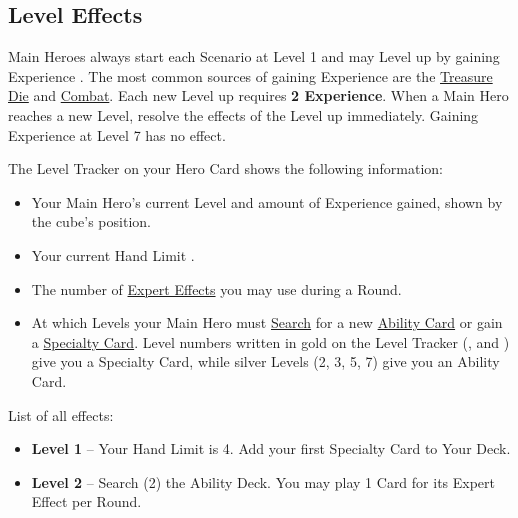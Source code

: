 
\clearpage

\begin{multicols}{2}

\subsection*{\hypertarget{Level}{Level Effects}}
Main Heroes always start each Scenario at Level 1 and may Level up by gaining Experience .
The most common sources of gaining Experience are the \hyperlink{Resources}{Treasure Die}  and \hyperlink{Combatexperience}{Combat}.
Each new Level up requires \textbf{2 Experience}.
When a Main Hero reaches a new Level, resolve the effects of the Level up immediately.
Gaining Experience at Level 7 has no effect.\par
The Level Tracker on your Hero Card shows the following information:
\begin{itemize}
\item Your Main Hero's current Level and amount of Experience gained, shown by the cube's position.
\item Your current Hand Limit .
\item The number of \hyperlink{Ability}{Expert Effects}  you may use during a Round.
\item At which Levels your Main Hero must \hyperlink{Playerdecks}{Search} for a new \hyperlink{Ability}{Ability Card} or gain a \hyperlink{Specialty}{Specialty Card}.
Level numbers written in gold on the Level Tracker (,  and ) give you a Specialty Card, while silver Levels (2, 3, 5, 7) give you an Ability Card.
\end{itemize}
\vfill\null
\columnbreak
List of all effects:
\begin{itemize}
\item \textbf{Level 1} – Your Hand Limit is 4.
Add your first Specialty Card to Your Deck.
\item \textbf{Level 2} – Search (2) the Ability Deck.
You may play 1 Card for its Expert Effect per Round.

\end{itemize}
\end{multicols}
